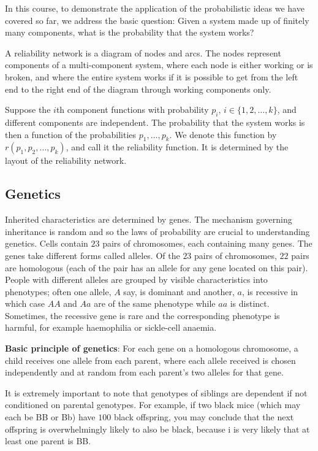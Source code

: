 \documentclass[10pt, a4paper]{article}
\begin{document}
In this course,
to demonstrate the application of the probabilistic ideas we have covered so far,
we address the basic question:
Given a system made up of finitely many components,
what is the probability that the system works?

\begin{definition}
    A reliability network is a diagram of nodes and arcs.
    The nodes represent components of a multi-component system,
    where each node is either working or is broken,
    and where the entire system works if it is possible to get from the left end to the right end of the diagram through working components only.
\end{definition}

Suppose the $i$th component functions with probability
$p_i,\, i \in \{1, 2, \dotsc, k\}$,
and different components are independent.
The probability that the system works is then a function of the probabilities
$p_1, \dotsc, p_k$.
We denote this function by
$r(p_1, p_2, \dotsc, p_k)$,
and call it the reliability function.
It is determined by the layout of the reliability network.

\subsection{Genetics}
Inherited characteristics are determined by genes.
The mechanism governing inheritance is random and so the laws of probability are crucial to understanding genetics.
Cells contain $23$ pairs of chromosomes,
each containing many genes.
The genes take different forms called alleles.
Of the $23$ pairs of chromosomes,
$22$ pairs are homologous
(each of the pair has an allele for any gene located on this pair).
People with different alleles are grouped by visible characteristics into phenotypes;
often one allele,
$A$ say,
is dominant and another,
$a$,
is recessive in which case $AA$ and $Aa$ are of the same phenotype while $aa$ is distinct.
Sometimes,
the recessive gene is rare and the corresponding phenotype is harmful,
for example haemophilia or sickle-cell anaemia.

\textbf{Basic principle of genetics}:
For each gene on a homologous chromosome,
a child receives one allele from each parent,
where each allele received is chosen independently and at random from each parent's two alleles for that gene.

It is extremely important to note that genotypes of siblings are dependent if not conditioned on parental genotypes.
For example,
if two black mice
(which may each be BB or Bb)
have $100$ black offspring,
you may conclude that the next offspring is overwhelmingly likely to also be black,
because i is very likely that at least one parent is BB.
\end{document}

